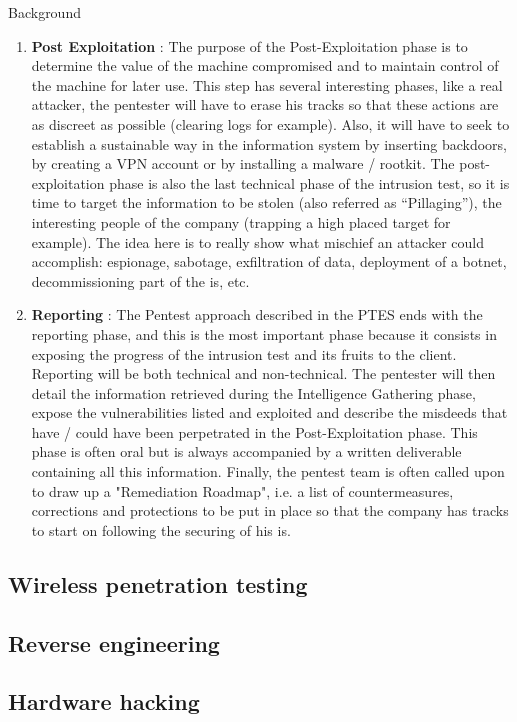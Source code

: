\begin{chaptercover}{Background}
\begin{enumerate}
  \item \textbf{Post Exploitation} : The purpose of the Post-Exploitation phase is to determine the value of the machine compromised and to maintain control of the machine for later use. This step has several interesting phases, like a real attacker, the pentester will have to erase his tracks so that these actions are as discreet as possible (clearing logs for example). Also, it will have to seek to establish a sustainable way in the information system by inserting backdoors, by creating a VPN account or by installing a malware / rootkit. The post-exploitation phase is also the last technical phase of the intrusion test, so it is time to target the information to be stolen (also referred as “Pillaging”), the interesting people of the company (trapping a high placed target for example). The idea here is to really show what mischief an attacker could accomplish: espionage, sabotage, exfiltration of data, deployment of a botnet, decommissioning part of the \acrshort{is}, etc.
  \item \textbf{Reporting} : The Pentest approach described in the PTES ends with the reporting phase, and this is the most important phase because it consists in exposing the progress of the intrusion test and its fruits to the client. Reporting will be both technical and non-technical. The pentester will then detail the information retrieved during the Intelligence Gathering phase, expose the vulnerabilities listed and exploited and describe the misdeeds that have / could have been perpetrated in the Post-Exploitation phase. This phase is often oral but is always accompanied by a written deliverable containing all this information. Finally, the pentest team is often called upon to draw up a "Remediation Roadmap", i.e. a list of countermeasures, corrections and protections to be put in place so that the company has tracks to start on following the securing of his \acrshort{is}.
\end{enumerate}

\subsection{Wireless penetration testing}


\subsection{Reverse engineering}


\subsection{Hardware hacking}



\end{chaptercover}
